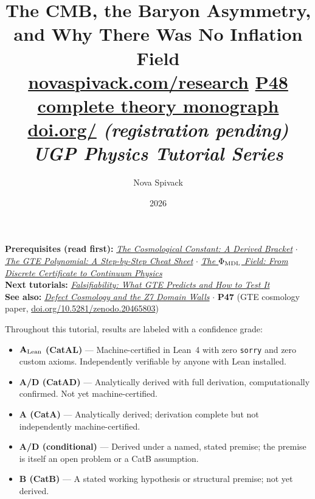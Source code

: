 \documentclass[11pt,a4paper]{article}
\date{2026}
\title{\textbf{The CMB, the Baryon Asymmetry,}\\[6pt]
\large\textbf{and Why There Was No Inflation Field}\\[8pt]
\normalsize
\href{https://novaspivack.com/research}{novaspivack.com/research}\quad
\href{https://doi.org/10.5281/zenodo.20560550}{P48 complete theory monograph}\\[4pt]
\small\href{https://doi.org/\TutorialDOI}{doi.org/\TutorialDOI}
  \textit{(registration pending)}\\[4pt]
\normalsize\textit{UGP Physics Tutorial Series}}
\author{Nova Spivack}
\begin{document}
\setcounter{tocdepth}{2}
\maketitle
\tableofcontents
\newpage

\begin{tcolorbox}[colback=blue!6,colframe=blue!40!black,
  title=\textbf{UGP Physics Tutorial Series}]
\textbf{Prerequisites (read first):}
  \href{https://doi.org/10.5281/zenodo.20657864}{\emph{The Cosmological Constant: A Derived Bracket}}
  $\cdot$
  \href{https://doi.org/10.5281/zenodo.20657889}{\emph{The GTE Polynomial: A Step-by-Step Cheat Sheet}}
  $\cdot$
  \href{https://doi.org/10.5281/zenodo.20657885}{\emph{The $\Phi_{\rm MDL}$ Field: From Discrete Certificate to Continuum Physics}}\\[4pt]
\textbf{Next tutorials:}
  \href{https://doi.org/10.5281/zenodo.20669142}{\emph{Falsifiability: What GTE Predicts and How to Test It}}\\[4pt]
\textbf{See also:}
  \href{https://doi.org/10.5281/zenodo.20657866}{\emph{Defect Cosmology and the Z7 Domain Walls}}
  $\cdot$
  \textbf{P47} (GTE cosmology paper,
  \href{https://doi.org/10.5281/zenodo.20465803}{doi.org/10.5281/zenodo.20465803})
\end{tcolorbox}

\begin{tcolorbox}[colback=boxgreen,colframe=green!50!black,
  title=\textbf{Claim-Strength Taxonomy}]
Throughout this tutorial, results are labeled with a confidence grade:
\begin{itemize}[itemsep=2pt]
  \item \textbf{$\mathbf{A}_{\rm Lean}$ (CatAL)} --- Machine-certified in Lean~4 with zero \texttt{sorry} and zero custom axioms.  Independently verifiable by anyone with Lean installed.
  \item \textbf{A/D (CatAD)} --- Analytically derived with full derivation, computationally confirmed.  Not yet machine-certified.
  \item \textbf{A (CatA)} --- Analytically derived; derivation complete but not independently machine-certified.
  \item \textbf{A/D (conditional)} --- Derived under a named, stated premise; the premise is itself an open problem or a CatB assumption.
  \item \textbf{B (CatB)} --- A stated working hypothesis or structural premise; not yet derived.
\end{itemize}
\end{tcolorbox}
\end{document}
